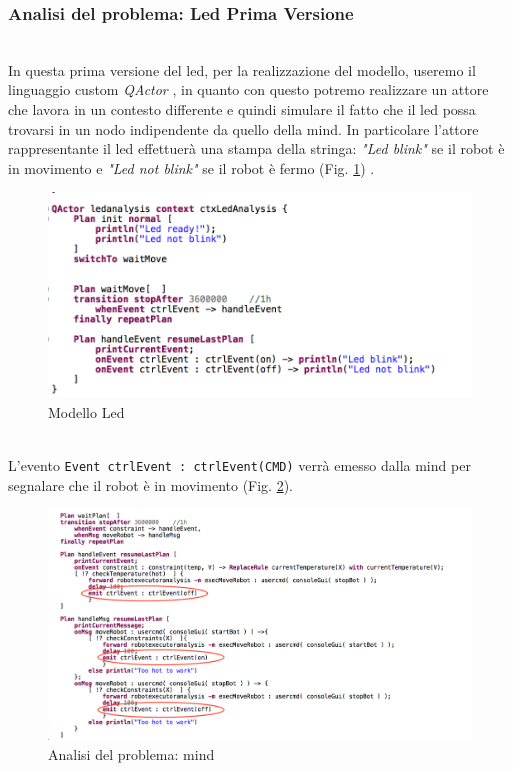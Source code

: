 \documentclass{llncs}
\newcommand{\qa}{\textsf{\textit{QActor }}}
\begin{document}
\subsubsection{Analisi del problema: Led Prima Versione} 
\label{AnalisidelproblemaReq4LedV1}
\vspace*{1ex}
\\
In questa prima versione del led, per la realizzazione del modello, useremo il linguaggio custom \qa, in quanto con questo potremo realizzare un attore che lavora in un contesto differente e quindi simulare il fatto che il led possa trovarsi in un nodo indipendente da quello della mind. In particolare l'attore rappresentante il led effettuer\`a una stampa della stringa: \textit{"Led blink"} se il robot \`e in movimento e \textit{"Led not blink"} se il robot \`e fermo (Fig. \hyperref[fig:ledModel]{\ref{fig:ledModel}}) .\\
\begin{figure}
    \centering
    \includegraphics[width=1\textwidth]{Immagini/Requisito4/ledAnReq4.png}
    \caption{Modello Led}
    \label{fig:ledModel}
\end{figure}\\
L'evento \texttt{Event ctrlEvent : ctrlEvent(CMD)} verr\`a emesso dalla mind per segnalare che il robot \`e in movimento (Fig. \hyperref[fig:Req4AnMind]{\ref{fig:Req4AnMind}}).\\
\begin{figure}
    \centering
    \includegraphics[width=1\textwidth]{Immagini/Requisito4/AnMindReq4.png}
    \caption{Analisi del problema: mind}
    \label{fig:Req4AnMind}
\end{figure}\\
\end{document}
